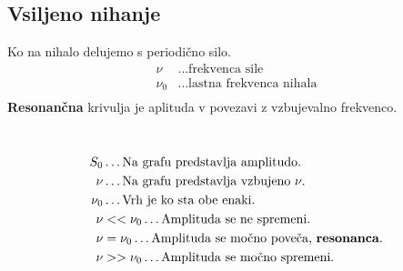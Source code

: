 {\color{indiagreen}\subsection{Vsiljeno nihanje}}
Ko na nihalo delujemo s periodično silo.\\
\begin{align*}
	\nu &\dots \text{frekvenca sile}\\
	\nu_0 &\dots \text{lastna frekvenca nihala}\\
\end{align*}
\textbf{Resonančna} krivulja je aplituda v povezavi z vzbujevalno frekvenco.\\
\\
\begin{align*}
	S_0 &\dots \text{Na grafu predstavlja amplitudo.}\\
	\nu &\dots \text{Na grafu predstavlja vzbujeno $\nu$.}\\
	\nu_0 &\dots \text{Vrh je ko sta obe enaki.}\\
	\nu &<<\nu_0 \dots \text{Amplituda se ne spremeni.}\\ 
	\nu &=\nu_0 \dots \text{Amplituda se močno poveča, \textbf{resonanca}.}\\
	\nu &>>\nu_0 \dots \text{Amplituda se močno spremeni.}\\
\end{align*}
